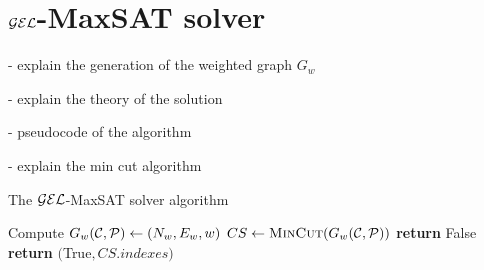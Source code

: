 \section{$\mathcal{GEL}$-MaxSAT solver}

- explain the generation of the weighted graph $G_w$



- explain the theory of the solution

- pseudocode of the algorithm

- explain the min cut algorithm

\begin{algorithm}
	\caption{The $\mathcal{GEL}$-MaxSAT solver algorithm}
  	\label{alg:gen-col}
	\begin{algorithmic}[1]
			\State Compute $G_w(\mathcal{C}, \mathcal{P}) \gets (N_w, E_w, w)$
			\State $CS \gets \Call{MinCut}{G_w(\CC, \PP)}$ 
				\State \textbf{return} False 
			\EndIf
			\Statex
			\State \textbf{return} $($True$, CS.indexes)$ 
		\EndFunction
	\end{algorithmic}
\end{algorithm}




